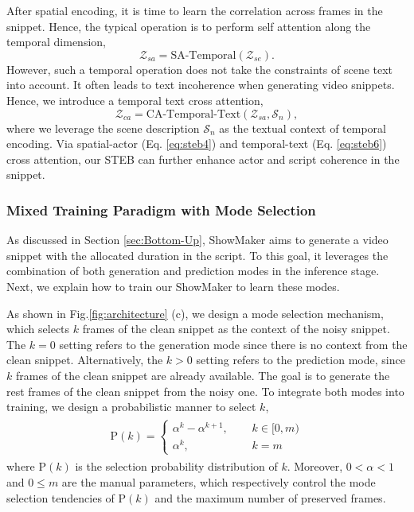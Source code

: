 After spatial encoding,
it is time to learn the correlation across frames in the snippet.
Hence,
the typical operation is to perform self attention along the temporal dimension,
\begin{equation}
\mathcal{Z}_{sa}=\text{SA-Temporal}(\mathcal{Z}_{se}).
\label{eq:steb5} 
\end{equation}
However,
such a temporal operation does not take the constraints of scene text into account.
It often leads to text incoherence when generating video snippets.
Hence,
we introduce a temporal text cross attention,
\begin{equation}
\mathcal{Z}_{ca}=\text{CA-Temporal-Text}(\mathcal{Z}_{sa},\mathcal{S}_{n}),
\label{eq:steb6} 
\end{equation}
where
we leverage the scene description $\mathcal{S}_{n}$ as the textual context of temporal encoding.
Via spatial-actor (Eq. \ref{eq:steb4}) and temporal-text (Eq. \ref{eq:steb6}) cross attention,
our STEB can further enhance actor and script coherence in the snippet.



\subsubsection{Mixed Training Paradigm with Mode Selection}

As discussed in Section \ref{sec:Bottom-Up},
ShowMaker aims to generate a video snippet with the allocated duration in the script.
To this goal,
it leverages the combination of both generation and prediction modes in the inference stage.
Next,
we explain how to train our ShowMaker to learn these modes.



As shown in Fig.\ref{fig:architecture} (c),
we design a mode selection mechanism,
which selects $k$ frames of the clean snippet as the context of the noisy snippet.
The $k$$=$$0$ setting refers to the generation mode 
since there is no context from the clean snippet.
Alternatively,
the $k$$>$$0$ setting refers to the prediction mode,
since $k$ frames of the clean snippet are already available.
The goal is to generate the rest frames of the clean snippet from the noisy one.
To integrate both modes into training,
we design a probabilistic manner to select $k$,
\begin{align}
\begin{split}
\text{P}(k)=\left\{
\begin{aligned}
\alpha^{k}-\alpha^{k+1},~~~~~~& k\in\lbrack0,m) \\
\alpha^{k},~~~~~~& k=m
\end{aligned}
\right.
\end{split}
\label{eq:alpham} 
\end{align}
where 
$\text{P}(k)$ is the selection probability distribution of $k$.
Moreover,
$0$$<$$\alpha$$<$$1$ and $0$$\leq$$m$ are the manual parameters,
which respectively control the mode selection tendencies of $\text{P}(k)$ and the maximum number of preserved frames. 

